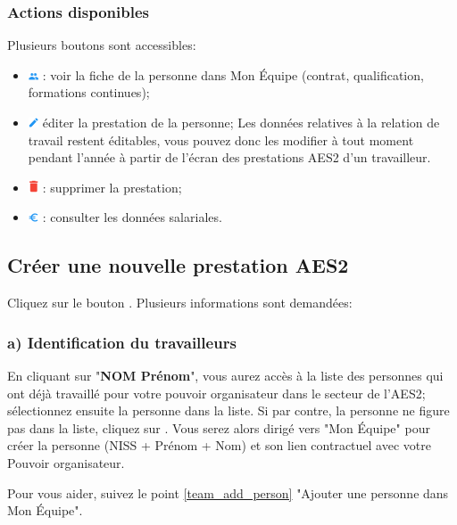 \subsubsection{Actions disponibles}
Plusieurs boutons sont accessibles:
\begin{itemize}[label=\textbullet]
    \item \includegraphics[width=0.3cm]{Images/icon/icon-me.png} : voir la fiche de la personne dans Mon Équipe (contrat, qualification, formations continues);
    \item \includegraphics[width=0.3cm]{Images/icon/icon-edit.png} éditer la prestation de la personne; Les données relatives à la relation de travail restent éditables, vous pouvez donc les modifier à tout moment pendant l'année à partir de l’écran des prestations AES2 d’un travailleur.
    \item \includegraphics[width=0.3cm]{Images/icon/icon-del.png} : supprimer la prestation;
    \item \includegraphics[width=0.3cm]{Images/icon/icon-subs.png} : consulter les données salariales.
    
\end{itemize}



\subsection{Créer une nouvelle prestation AES2}\label{création_prestation_aes2}
Cliquez sur le bouton . Plusieurs informations sont demandées: 


\subsubsection{a) Identification du travailleurs}
En cliquant sur "\textbf{NOM Prénom}", vous aurez accès à la liste des personnes qui ont déjà travaillé pour votre pouvoir organisateur dans le secteur de l'AES2;  sélectionnez ensuite la personne dans la liste. Si par contre, la personne ne figure pas dans la liste, cliquez sur . Vous serez alors dirigé vers "Mon Équipe" pour créer la personne (NISS + Prénom + Nom) et son lien contractuel avec votre Pouvoir organisateur. 
\begin{conseil}
Pour vous aider, suivez le point \ref{team_add_person} "Ajouter une personne dans Mon Équipe".
\end{conseil}



